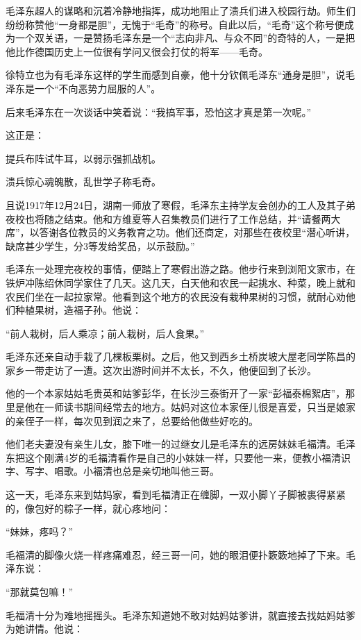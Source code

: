 \documentclass[../../dazhuan.tex]{subfiles}
\begin{document}
毛泽东超人的谋略和沉着冷静地指挥，成功地阻止了溃兵们进入校园行劫。师生们纷纷称赞他“一身都是胆”，无愧于“毛奇”的称号。自此以后，“毛奇”这个称号便成为一个双关语，一是赞扬毛泽东是一个“志向非凡、与众不同”的奇特的人，一是把他比作德国历史上一位很有学问又很会打仗的将军——毛奇。

徐特立也为有毛泽东这样的学生而感到自豪，他十分钦佩毛泽东“通身是胆”，说毛泽东是一个“不向恶势力屈服的人”。

后来毛泽东在一次谈话中笑着说：“我搞军事，恐怕这才真是第一次呢。”

这正是：\begin{xemph}提兵布阵试牛耳，以弱示强抓战机。


\hspace{4em}溃兵惊心魂魄散，乱世学子称毛奇。\end{xemph}


且说1917年12月24日，湖南一师放了寒假，毛泽东主持学友会创办的工人及其子弟夜校也将随之结束。他和方维夏等人召集教员们进行了工作总结，并“请餐两大席”，以答谢各位教员的义务教育之功。他们还商定，对那些在夜校里“潜心听讲，缺席甚少学生，分3等发给奖品，以示鼓励。”

毛泽东一处理完夜校的事情，便踏上了寒假出游之路。他步行来到浏阳文家市，在铁炉冲陈绍休同学家住了几天。这几天，白天他和农民一起挑水、种菜，晚上就和农民们坐在一起拉家常。他看到这个地方的农民没有栽种果树的习惯，就耐心劝他们种植果树，造福子孙。他说：

“前人栽树，后人乘凉；前人栽树，后人食果。”

毛泽东还亲自动手栽了几棵板栗树。之后，他又到西乡土桥炭坡大屋老同学陈昌的家乡一带走访了一遭。这次出游时间并不太长，不久，他便回到了长沙。

他的一个本家姑姑毛贵英和姑爹彭华，在长沙三泰街开了一家“彭福泰棉絮店”，那里是他在一师读书期间经常去的地方。姑妈对这位本家侄儿很是喜爱，只当是娘家的亲侄子一样，每次见到润之来了，总要给他做些好吃的。

他们老夫妻没有亲生儿女，膝下唯一的过继女儿是毛泽东的远房妹妹毛福清。毛泽东把这个刚满4岁的毛福清看作是自己的小妹妹一样，只要他一来，便教小福清识字、写字、唱歌。小福清也总是亲切地叫他三哥。

这一天，毛泽东来到姑妈家，看到毛福清正在缠脚，一双小脚丫子脚被裹得紧紧的，像包好的粽子一样，就心疼地问：

“妹妹，疼吗？”

毛福清的脚像火烧一样疼痛难忍，经三哥一问，她的眼泪便扑簌簌地掉了下来。毛泽东说：

“那就莫包嘛！”

毛福清十分为难地摇摇头。毛泽东知道她不敢对姑妈姑爹讲，就直接去找姑妈姑爹为她讲情。他说：
\end{document}
